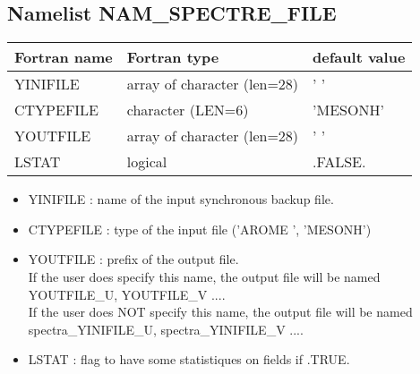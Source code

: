 \subsection{Namelist NAM\_SPECTRE\_FILE}
\begin{center}
\begin{tabular} {|l|l|l|}
\hline
Fortran name & Fortran type & default value \\
\hline
YINIFILE    & array of character (len=28)  & ' '\\
CTYPEFILE   & character (LEN=6)  & 'MESONH'      \\
YOUTFILE    & array of character (len=28)  & ' '\\
LSTAT       & logical  & .FALSE. \\        
\hline
\end{tabular}
\end{center}
\begin{itemize}
\item YINIFILE : name of the input synchronous backup file.
\item CTYPEFILE : type of the input  file ('AROME ', 'MESONH')
\item YOUTFILE  : prefix of the output file.\\
If the user does specify this name, the output file will be named YOUTFILE\_U, YOUTFILE\_V ....\\
If the user does NOT specify this name, the output file will be named spectra\_YINIFILE\_U, spectra\_YINIFILE\_V ....
\item LSTAT : flag to have some statistiques on fields if .TRUE.
\end{itemize}

